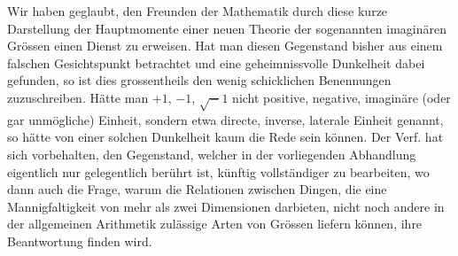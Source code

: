 Wir haben geglaubt, den Freunden der Mathematik durch diese kurze Darstellung der Hauptmomente einer neuen Theorie der sogenannten imaginären Grössen einen Dienst zu erweisen. Hat man diesen Gegenstand bisher aus einem falschen Gesichtspunkt betrachtet und eine geheimnissvolle Dunkelheit dabei 
%
gefunden, so ist dies grossentheils den wenig schicklichen Benennungen zuzuschreiben. Hätte man $+1$, $-1$, $\surd-1$ nicht positive, negative, imaginäre (oder gar unmögliche) Einheit, sondern etwa directe, inverse, laterale Einheit genannt, so hätte von einer solchen Dunkelheit kaum die Rede sein können. Der Verf. hat sich vorbehalten, den Gegenstand, welcher in der vorliegenden Abhandlung eigentlich nur gelegentlich berührt ist, künftig vollständiger zu bearbeiten, wo dann auch die Frage, warum die Relationen zwischen Dingen, die eine Mannigfaltigkeit von mehr als zwei Dimensionen darbieten, nicht noch andere in der allgemeinen Arithmetik zulässige Arten von Grössen liefern können, ihre Beantwortung finden wird.

\clearpage
{}%
\thispagestyle{empty}
\begin{center}
\vspace*{1in}{\Large ANZEIGEN\par}
\vspace{.4in}{\large NICHT EIGNER\par}
\vspace{.4in}{\Large SCHRIFTEN.\par}
\end{center}

